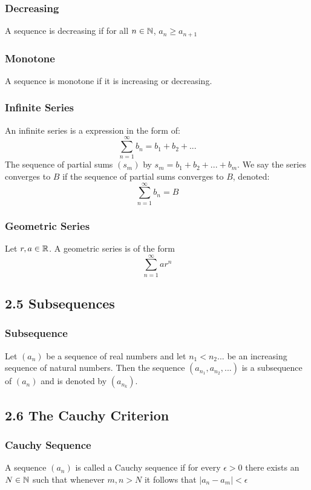 \documentclass{article}
\begin{document}
\subsubsection*{Decreasing}
A sequence is decreasing if for all $n \in \protect\mathbb{N}$, $a_n \ge a_{n+1}$

\subsubsection*{Monotone}
A sequence is monotone if it is increasing or decreasing.

\subsubsection*{Infinite Series}
An infinite series is a expression in the form of:
\begin{equation*}
\sum_{n=1}^{\infty} b_n = b_1 + b_2 + ...
\end{equation*}
The sequence of partial sums $(s_m)$ by $s_m = b_1 + b_2 + ... + b_m$. We say the series converges to $B$ if the sequence of partial sums converges to $B$, denoted:
\begin{equation*}
\sum_{n=1}^{\infty} b_n = B
\end{equation*}

\subsubsection*{Geometric Series}
Let $r,a \in \protect\mathbb{R}$. A geometric series is of the form
\begin{equation*}
\sum_{n=1}^{\infty} ar^n
\end{equation*}

\subsection*{2.5 Subsequences}
\subsubsection*{Subsequence}
Let $(a_n)$ be a sequence of real numbers and let $n_1 < n_2 ...$ be an increasing sequence of natural numbers.
Then the sequence $(a_{n_1}, a_{n_2},...)$ is a subsequence of $(a_n)$ and is denoted by $(a_{n_k})$.

\subsection*{2.6 The Cauchy Criterion}
\subsubsection*{Cauchy Sequence}
A sequence $(a_n)$ is called a Cauchy sequence if for every $\epsilon > 0$ there exists an $N \in \protect\mathbb{N}$ such that whenever $m,n>N$ it follows that $|a_n -a_m|<\epsilon$
\end{document}
